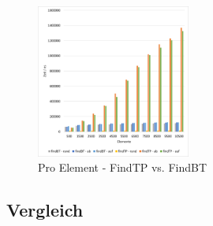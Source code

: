 \begin{figure}[hbt]
    \centering
    \includegraphics[width=0.45\textwidth]{img/excel/splay_tp_vs_bt.png}
    \caption{Pro Element - FindTP vs. FindBT}
    \label{fig:splay-bt-vs-tp}
\end{figure}


\FloatBarrier
\subsection{Vergleich}